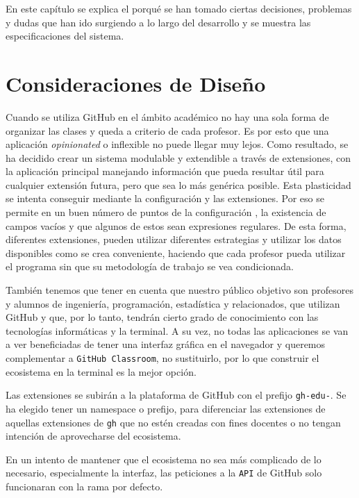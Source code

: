 En este capítulo se explica el porqué se han tomado ciertas decisiones, problemas y dudas que han ido surgiendo a lo largo del desarrollo y se muestra las especificaciones del sistema.

\section{Consideraciones de Diseño}
Cuando se utiliza GitHub en el ámbito académico no hay una sola forma de organizar las clases y queda a criterio de cada profesor. Es por esto que una aplicación \emph{opinionated} o inflexible no puede llegar muy lejos. Como resultado, se ha decidido crear un sistema modulable y extendible a través de extensiones, con la aplicación principal manejando información que pueda resultar útil para cualquier extensión futura, pero que sea lo más genérica posible. Esta plasticidad se intenta conseguir mediante la configuración y las extensiones. Por eso se permite en un buen número de puntos  de la configuración , la existencia de campos vacíos y que algunos de estos sean expresiones regulares. De esta forma, diferentes extensiones, pueden utilizar diferentes estrategias y utilizar los datos disponibles como se crea conveniente, haciendo que cada profesor pueda utilizar el programa sin que su metodología de trabajo se vea condicionada.

También tenemos que tener en cuenta que nuestro público objetivo son profesores y alumnos de ingeniería, programación, estadística y relacionados, que utilizan GitHub y que, por lo tanto, tendrán cierto grado de conocimiento con las tecnologías informáticas y la terminal. A su vez, no todas las aplicaciones se van a ver beneficiadas de tener una interfaz gráfica en el navegador y queremos complementar a \verb|GitHub Classroom|, no sustituirlo, por lo que construir el ecosistema en la terminal es la mejor opción.

Las extensiones se subirán a la plataforma de GitHub con el prefijo \verb|gh-edu-|. Se ha elegido tener un \gls{namespace} o prefijo, para diferenciar las extensiones de aquellas extensiones de \verb|gh| que no estén creadas con fines docentes o no tengan intención de aprovecharse del ecosistema.

En un intento de mantener que el ecosistema no sea más complicado de lo necesario, especialmente la interfaz, las peticiones a la \verb|API| de GitHub solo funcionaran con la rama por defecto.

